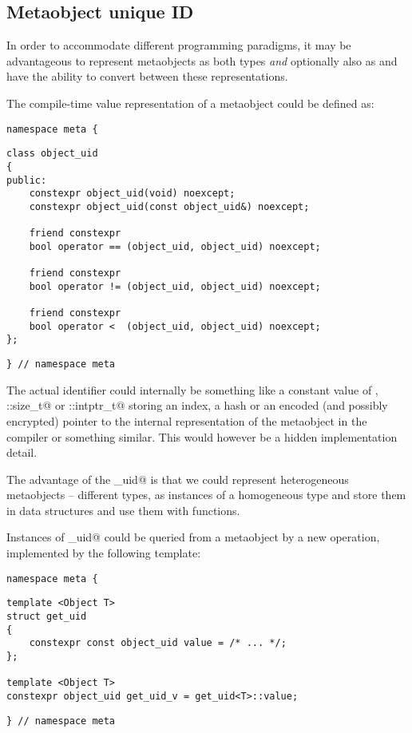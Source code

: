 \subsection{Metaobject unique ID}
\label{fut-metaobject-uid}

In order to accommodate different programming paradigms, it may be advantageous
to represent metaobjects as both types {\em and} optionally also as
 and have the ability to convert between these
representations.

The compile-time value representation of a metaobject could be defined as:

\begin{verbatim}
namespace meta {
\end{verbatim}
\begin{verbatim}
class object_uid
{
public:
	constexpr object_uid(void) noexcept;
	constexpr object_uid(const object_uid&) noexcept;

	friend constexpr
	bool operator == (object_uid, object_uid) noexcept;

	friend constexpr
	bool operator != (object_uid, object_uid) noexcept;

	friend constexpr
	bool operator <  (object_uid, object_uid) noexcept;
};
\end{verbatim}
\begin{verbatim}
} // namespace meta
\end{verbatim}

The actual identifier could internally be something like a constant value of
\verb@int@, \verb@std::size_t@ or \verb@std::intptr_t@ storing an index, a hash
or an encoded (and possibly encrypted) pointer to the internal representation
of the metaobject in the compiler or something similar.
This would however be a hidden implementation detail.

The advantage of the \verb@object_uid@ is that we could represent heterogeneous
metaobjects -- different types, as \verb@constexpr@ instances of a homogeneous
type and store them in \verb@constexpr@ data structures and use them with
\verb@constexpr@ functions.

Instances of \verb@object_uid@ could be queried from a metaobject by a new
operation, implemented by the following template:

\begin{verbatim}
namespace meta {
\end{verbatim}
\begin{verbatim}
template <Object T>
struct get_uid
{
	constexpr const object_uid value = /* ... */;
};

template <Object T>
constexpr object_uid get_uid_v = get_uid<T>::value;
\end{verbatim}
\begin{verbatim}
} // namespace meta
\end{verbatim}

